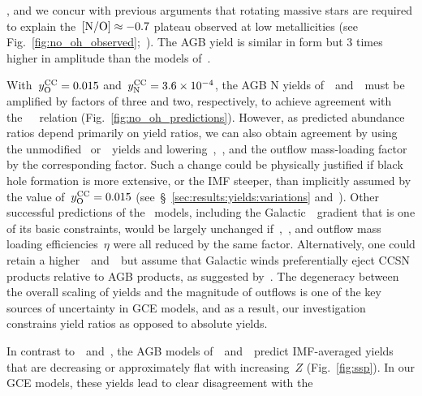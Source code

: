 \documentclass[ms.tex]{subfiles}
\begin{document}
\mbox{\citet{Limongi2018}}, and we concur with previous arguments that rotating
massive
stars are required to explain the~$\text{[N/O]} \approx -0.7$ plateau observed at low
metallicities (see Fig.~\ref{fig:no_oh_observed};~\citealp{Chiappini2003,
Chiappini2005, Chiappini2006, Kobayashi2011, Prantzos2018, Grisoni2021}).
The AGB yield is similar in form but 3 times higher in amplitude than the
models of~\cristallo.
\par
With~$y_\text{O}^\text{CC} = 0.015$ and~$y_\text{N}^\text{CC} = 3.6\times10^{-4}$, the AGB N yields
of~\cristallo~and~\ventura~must be amplified by factors of three and two,
respectively, to achieve agreement with
the~\mbox{\citet{Dopita2016}}~\ohno~relation (Fig.~\ref{fig:no_oh_predictions}).
However, as predicted abundance ratios depend primarily on yield ratios, we can
also obtain agreement by using the
unmodified
\cristallo~or~\ventura~yields and
lowering~,~, and the
outflow mass-loading factor by the corresponding factor.
Such a change could be physically justified if black hole formation is more
extensive, or the IMF steeper, than implicitly assumed by the value
of~$y_\text{O}^\text{CC} = 0.015$ (see~\S~\ref{sec:results:yields:variations}
and~\mbox{\citealp{Griffith2021}}).
Other successful predictions of the~\mbox{\citet{Johnson2021}} models,
including the
Galactic~\oh~gradient that is one of its basic constraints, would be largely
unchanged if~,~, and outflow mass loading efficiencies~$\eta$
were all reduced by the same factor.
Alternatively, one could retain a higher~~and~~but assume that
Galactic winds preferentially eject CCSN products relative to AGB products, as
suggested by~\mbox{\citet{Vincenzo2016a}}.
The degeneracy between the overall scaling of yields and the magnitude of
outflows is one of the key sources of uncertainty in GCE models,
and as a result, our investigation constrains yield ratios as opposed to
absolute yields.
\par
In contrast to~\cristallo~and~\ventura, the AGB models
of~\karakasten~and~\karakas~predict IMF-averaged yields that are decreasing or
approximately flat with increasing~$Z$ (Fig.~\ref{fig:ssp}).
In our GCE models, these yields lead to clear disagreement with the
\end{document}
